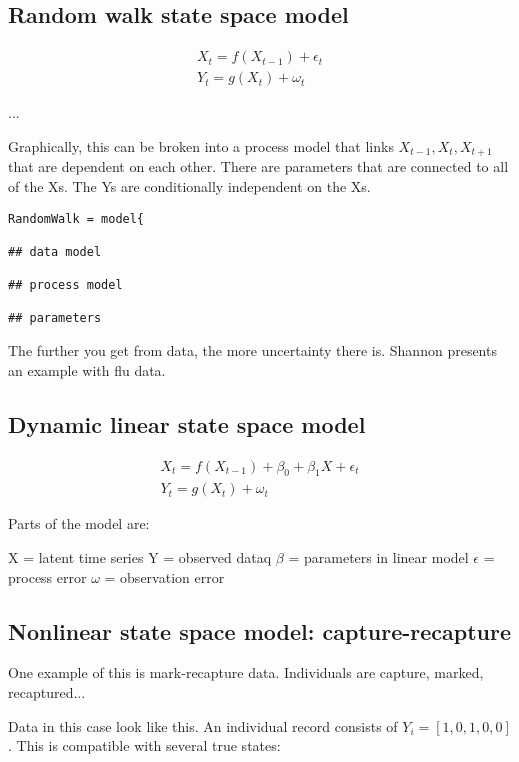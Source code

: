 \documentclass[12pt, oneside]{article}   	%
\begin{document}
\subsection{Random walk state space model}

\begin{align}
X_{t} = f(X_{t-1}) + \epsilon_t \\
Y_t = g(X_t) + \omega_t \
\end{align}

...

Graphically, this can be broken into a process model that links $X_{t-1}, X_t, X_{t+1}$ that are dependent on each other. There are parameters that are connected to all of the Xs. The Ys are conditionally independent on the Xs. 

\begin{lstlisting}
RandomWalk = model{

## data model

## process model

## parameters

\end{lstlisting}

The further you get from data, the more uncertainty there is. Shannon presents an example with flu data. 

\subsection{Dynamic linear state space model}

\begin{align}
X_{t} = f(X_{t-1}) + \beta_0 +\beta_1 X + \epsilon_t \\
Y_t = g(X_t) + \omega_t \
\end{align}

Parts of the model are: 

X = latent time series
Y = observed dataq
$\beta$ = parameters in linear model
$\epsilon$ = process error
$\omega$ = observation error

\subsection{Nonlinear state space model: capture-recapture}

One example of this is mark-recapture data. Individuals are capture, marked, recaptured...

Data in this case look like this. An individual record consists of $Y_i = [1,0,1,0,0]$. This is compatible with several true states:
\end{document}

